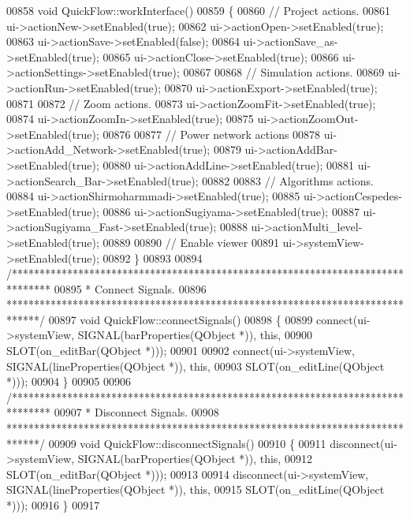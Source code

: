 \begin{DoxyCode}
00858 \textcolor{keywordtype}{void} QuickFlow::workInterface()
00859 \{
00860   \textcolor{comment}{// Project actions.}
00861   ui->actionNew->setEnabled(\textcolor{keyword}{true});
00862   ui->actionOpen->setEnabled(\textcolor{keyword}{true});
00863   ui->actionSave->setEnabled(\textcolor{keyword}{false});
00864   ui->actionSave\_as->setEnabled(\textcolor{keyword}{true});
00865   ui->actionClose->setEnabled(\textcolor{keyword}{true});
00866   ui->actionSettings->setEnabled(\textcolor{keyword}{true});
00867 
00868   \textcolor{comment}{// Simulation actions.}
00869   ui->actionRun->setEnabled(\textcolor{keyword}{true});
00870   ui->actionExport->setEnabled(\textcolor{keyword}{true});
00871 
00872   \textcolor{comment}{// Zoom actions.}
00873   ui->actionZoomFit->setEnabled(\textcolor{keyword}{true});
00874   ui->actionZoomIn->setEnabled(\textcolor{keyword}{true});
00875   ui->actionZoomOut->setEnabled(\textcolor{keyword}{true});
00876 
00877   \textcolor{comment}{// Power network actions}
00878   ui->actionAdd\_Network->setEnabled(\textcolor{keyword}{true});
00879   ui->actionAddBar->setEnabled(\textcolor{keyword}{true});
00880   ui->actionAddLine->setEnabled(\textcolor{keyword}{true});
00881   ui->actionSearch\_Bar->setEnabled(\textcolor{keyword}{true});
00882 
00883   \textcolor{comment}{// Algorithms actions.}
00884   ui->actionShirmoharmmadi->setEnabled(\textcolor{keyword}{true});
00885   ui->actionCespedes->setEnabled(\textcolor{keyword}{true});
00886   ui->actionSugiyama->setEnabled(\textcolor{keyword}{true});
00887   ui->actionSugiyama\_Fast->setEnabled(\textcolor{keyword}{true});
00888   ui->actionMulti\_level->setEnabled(\textcolor{keyword}{true});
00889 
00890   \textcolor{comment}{// Enable viewer}
00891   ui->systemView->setEnabled(\textcolor{keyword}{true});
00892 \}
00893 
00894 \textcolor{comment}{/*******************************************************************************}
00895 \textcolor{comment}{ * Connect Signals.}
00896 \textcolor{comment}{ ******************************************************************************/}
00897 \textcolor{keywordtype}{void} QuickFlow::connectSignals()
00898 \{
00899   connect(ui->systemView, SIGNAL(barProperties(QObject *)), \textcolor{keyword}{this},
00900           SLOT(on\_editBar(QObject *)));
00901 
00902   connect(ui->systemView, SIGNAL(lineProperties(QObject *)), \textcolor{keyword}{this},
00903           SLOT(on\_editLine(QObject *)));
00904 \}
00905 
00906 \textcolor{comment}{/*******************************************************************************}
00907 \textcolor{comment}{ * Disconnect Signals.}
00908 \textcolor{comment}{ ******************************************************************************/}
00909 \textcolor{keywordtype}{void} QuickFlow::disconnectSignals()
00910 \{
00911   disconnect(ui->systemView, SIGNAL(barProperties(QObject *)), \textcolor{keyword}{this},
00912              SLOT(on\_editBar(QObject *)));
00913 
00914   disconnect(ui->systemView, SIGNAL(lineProperties(QObject *)), \textcolor{keyword}{this},
00915              SLOT(on\_editLine(QObject *)));
00916 \}
00917 
\end{DoxyCode}
